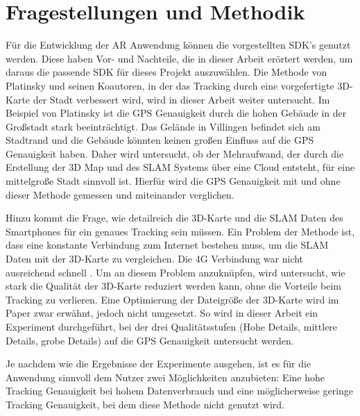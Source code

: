 \section{Fragestellungen und Methodik}
Für die Entwicklung der AR Anwendung können die vorgestellten SDK's genutzt werden. Diese haben Vor- und Nachteile, die in dieser Arbeit erörtert werden, um daraus die passende SDK für dieses Projekt auszuwählen. Die Methode von Platinsky und seinen Koautoren\cite{platinsky}, in der das Tracking durch eine vorgefertigte 3D-Karte der Stadt verbessert wird, wird in dieser Arbeit weiter untersucht. Im Beispiel von Platinsky ist die GPS Genauigkeit durch die hohen Gebäude in der Großstadt stark beeinträchtigt. Das Gelände in Villingen befindet sich am Stadtrand und die Gebäude könnten keinen großen Einfluss auf die GPS Genauigkeit haben. Daher wird untersucht, ob der Mehraufwand, der durch die Erstellung der 3D Map und des SLAM Systems über eine Cloud entsteht, für eine mittelgroße Stadt sinnvoll ist. Hierfür wird die GPS Genauigkeit mit und ohne dieser Methode gemessen und miteinander verglichen.

Hinzu kommt die Frage, wie detailreich die 3D-Karte und die SLAM Daten des Smartphones für ein genaues Tracking sein müssen. Ein Problem der Methode ist, dass eine konstante Verbindung zum Internet bestehen muss, um die SLAM Daten mit der 3D-Karte zu vergleichen. Die 4G Verbindung war nicht ausreichend schnell \cite*[][sinngemäß aus]{platinsky}. Um an diesem Problem anzuknüpfen, wird untersucht, wie stark die Qualität der 3D-Karte reduziert werden kann, ohne die Vorteile beim Tracking zu verlieren. Eine Optimierung der Dateigröße der 3D-Karte wird im Paper zwar erwähnt, jedoch nicht umgesetzt. So wird in dieser Arbeit ein Experiment durchgeführt, bei der drei Qualitätsstufen (Hohe Details, mittlere Details, grobe Details) auf die GPS Genauigkeit untersucht werden. 

Je nachdem wie die Ergebnisse der Experimente ausgehen, ist es für die Anwendung sinnvoll dem Nutzer zwei Möglichkeiten anzubieten: Eine hohe Tracking Genauigkeit bei hohem Datenverbrauch und eine möglicherweise geringe Tracking Genauigkeit, bei dem diese Methode nicht genutzt wird.
